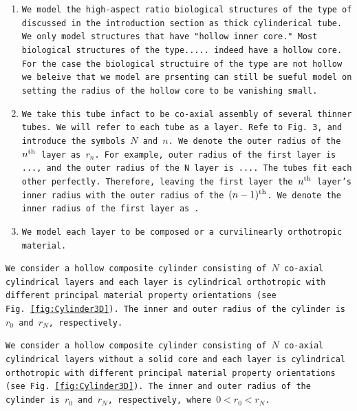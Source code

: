 \documentclass[preprint,12pt,times]{elsarticle}
\numberwithin{equation}{section}
\renewcommand{\>}{$\Rightarrow$}
\begin{document}
\begin{enumerate}
  \item \texttt{We model the high-aspect ratio biological structures of the type of discussed in the introduction section as thick cylinderical tube. We only model structures that have "hollow inner core." Most biological structures of the type..... indeed have a hollow core. For the case the biological structuire of the type are not hollow we beleive that we model are prsenting can still be sueful model on setting the radius of the hollow core to be vanishing small.}

  \item \texttt{We take this tube infact to be co-axial assembly of several thinner tubes. We will refer to each tube as a layer. Refe to Fig. 3, and introduce the symbols $N$ and $n$. We denote the outer radius of the $n^{\rm th}$ layer as $r_{n}$. For example, outer radius of the first layer is ..., and the outer radius of the N layer is ....
  The tubes fit each other perfectly. Therefore, leaving the first layer the $n^{\rm th}$ layer's inner radius with the outer radius of the $(n-1)^{\rm th}$. We denote the inner radius of the first layer as .}

  \item \texttt{We model each layer to be composed or a curvilinearly orthotropic material.}

\end{enumerate}


\texttt{We consider a hollow composite cylinder consisting of~$N$ co-axial cylindrical layers and each layer is cylindrical orthotropic with different principal material property orientations (see Fig.~\ref{fig:Cylinder3D}). The inner and outer radius of the cylinder is~$r_{0}$ and~$r_{N}$, respectively.}

\texttt{We consider a hollow composite cylinder consisting of~$N$ co-axial cylindrical layers without a solid core and each layer is cylindrical orthotropic with different principal material property orientations (see Fig.~\ref{fig:Cylinder3D}). The inner and outer radius of the cylinder is~$r_{0}$ and~$r_{N}$, respectively, where $0 < r_{0}<r_{N}$.}
\end{document}
